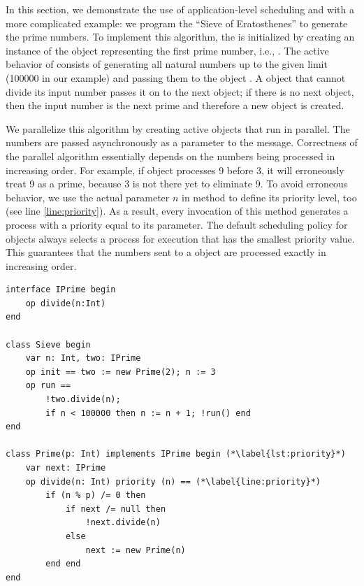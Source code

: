 In this section, we demonstrate the use of application-level scheduling and \Crisp with a more complicated example: we program the ``Sieve of Eratosthenes'' %
to generate the prime numbers. 
To implement this algorithm, the 
 is initialized by creating an instance of the  object representing the first prime number, i.e., . The active behavior of  consists of generating all natural numbers up to the given limit (100000 in our example) and passing them to the object . 
A  object that cannot divide its input number passes it on to the next  object; if there is no next object, then the input number is the next prime and therefore a new object is created.

We parallelize this algorithm by creating active objects that run in parallel.
The numbers are passed asynchronously as a parameter to the  message. 
Correctness of the parallel algorithm essentially depends on the numbers being processed in increasing order.
For example, if object  processes 9 before 3, it will erroneously treat 9 as a prime, because 3 is not there yet to eliminate 9. 
%
To avoid erroneous behavior, we use the actual parameter $n$ in  method to define its priority level, too (see line \ref{line:priority}). 
As a result, every invocation of this method generates a process with a priority equal to its parameter.
The default scheduling policy for objects always selects a process for execution that has the smallest priority value. 
This guarantees that the numbers sent to a  object are processed exactly in increasing order. 

\begin{lstlisting}[float=t, label=lst:prime-sieve-creol, caption=Prime Sieve in Creol]
interface IPrime begin
	op divide(n:Int)
end

class Sieve begin
	var n: Int, two: IPrime
	op init == two := new Prime(2); n := 3
	op run ==
		!two.divide(n);
		if n < 100000 then n := n + 1; !run() end
end

class Prime(p: Int) implements IPrime begin (*\label{lst:priority}*)
	var next: IPrime
	op divide(n: Int) priority (n) == (*\label{line:priority}*)
		if (n % p) /= 0 then 
			if next /= null then
				!next.divide(n)
			else
				next := new Prime(n)
		end end
end
\end{lstlisting}
% 

